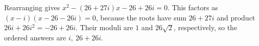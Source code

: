Rearranging gives $x^2-(26+27i)x-26+26i=0$. This factors as $(x-i)(x-26-26i)=0$, because the roots have sum $26+27i$ and product $26i+26i^2=-26+26i$. Their moduli are $1$ and $26\sqrt2$, respectively, so the ordered answers are $\boxed{i,\ 26+26i}$.
